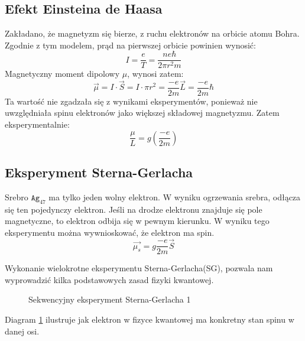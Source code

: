 \documentclass{../notatki}
\begin{document}
\subsection{Efekt Einsteina de Haasa}

Zakładano, że magnetyzm się bierze, z ruchu elektronów na orbicie atomu
Bohra. Zgodnie z tym modelem, prąd na pierwszej orbicie powinien wynosić:
$$
I = \frac{e}{T} = \frac{ne\hbar}{2\pi r^2m}
$$
Magnetyczny moment dipolowy $\mu$, wynosi zatem:
$$
\vec{\mu} = I \cdot \vec{S} = I \cdot \pi r^2 = \frac{-e}{2m} \vec{L}
= \frac{-e}{2m} \hbar
$$
Ta wartość nie zgadzała się z wynikami eksperymentów, ponieważ nie uwzględniała
spinu elektronów jako większej składowej magnetyzmu. Zatem eksperymentalnie:
$$
\frac{\mu}{L} = g(\frac{-e}{2m})
$$

\subsection{Eksperyment Sterna-Gerlacha}

Srebro $\texttt{Ag}_{47}$ ma tylko jeden wolny elektron. W wyniku ogrzewania
srebra, odłącza się ten pojedynczy elektron. Jeśli na drodze elektronu
znajduje się pole magnetyczne, to elektron odbija się w pewnym kierunku.
W wyniku tego eksperymentu można wywnioskować, że elektron ma spin.
$$
\vec{\mu_s} = g\frac{-e}{2m} \vec{S}
$$

Wykonanie wielokrotne eksperymentu Sterna-Gerlacha(SG), pozwala nam wyprowadzić
kilka podstawowych zasad fizyki kwantowej.
\begin{figure}[h]
  \centering
  \caption{Sekwencyjny eksperyment Sterna-Gerlacha 1}
  \label{fig:sg1}
\end{figure}
Diagram \cref{fig:sg1} ilustruje jak elektron w fizyce kwantowej ma konkretny
stan spinu w danej osi.
\end{document}
